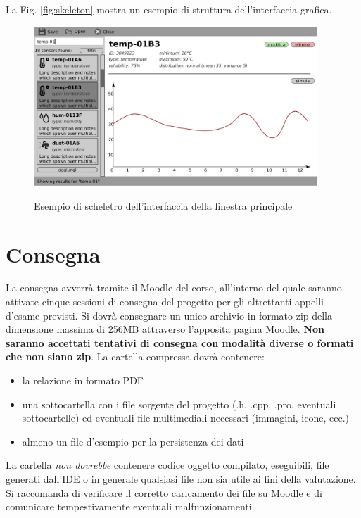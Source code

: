 \documentclass[10pt,a4paper,oneside]{article}
\begin{document}
\begin{enumerate}
La Fig. \ref{fig:skeleton} mostra un esempio di struttura dell'interfaccia grafica.

\begin{figure}
 \includegraphics[width=0.95\textwidth]{assets/gui-skeleton-sample}
 \label{fig:roadmap}
 \caption{Esempio di scheletro dell'interfaccia della finestra principale}
\end{figure}
\end{enumerate}

\section{Consegna}
La consegna avverrà tramite il Moodle del corso, all'interno del quale saranno attivate cinque sessioni di consegna del progetto per gli altrettanti appelli d'esame previsti. Si dovrà consegnare un unico archivio in formato zip della dimensione massima di 256MB attraverso l'apposita pagina Moodle. \textbf{Non saranno accettati tentativi di consegna con modalità diverse o formati che non siano zip}. La cartella compressa dovrà contenere:
\begin{itemize}
 \item la relazione in formato PDF
 \item una sottocartella con i file sorgente del progetto (.h, .cpp, .pro, eventuali sottocartelle) ed eventuali file multimediali necessari (immagini, icone, ecc.)
 \item almeno un file d'esempio per la persistenza dei dati
\end{itemize}
La cartella \emph{non dovrebbe} contenere codice oggetto compilato, eseguibili, file generati dall'IDE o in generale qualsiasi file non sia utile ai fini della valutazione. Si raccomanda di verificare il corretto caricamento dei file su Moodle e di comunicare tempestivamente eventuali malfunzionamenti.
\end{document}
